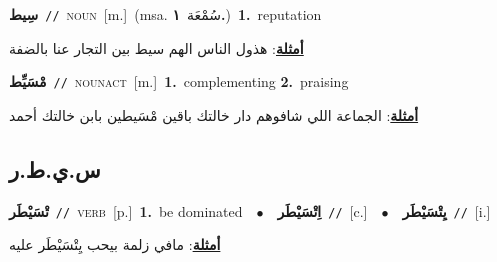 \documentclass[10pt,a4paper,twoside]{article} %
\begin{document}
\begin{multicols}{2}
{\setlength\topsep{0pt}\textbf{\foreignlanguage{arabic}{سِيط}}\ {\color{gray}\texttt{//}\color{black}}\ \textsc{noun}\ [m.]\ \color{gray}(msa. \foreignlanguage{arabic}{سُمْعَة}~\foreignlanguage{arabic}{\textbf{١.}})\color{black}\ \textbf{1.}~reputation\  \begin{flushright}\color{gray}\foreignlanguage{arabic}{\textbf{\underline{\foreignlanguage{arabic}{أمثلة}}}: هذول الناس الهم سيط بين التجار عنا بالضفة}\end{flushright}\color{black}} \vspace{2mm}

{\setlength\topsep{0pt}\textbf{\foreignlanguage{arabic}{مْسَيِّط}}\ {\color{gray}\texttt{//}\color{black}}\ \textsc{noun\textunderscore act}\ [m.]\ \textbf{1.}~complementing  \textbf{2.}~praising\  \begin{flushright}\color{gray}\foreignlanguage{arabic}{\textbf{\underline{\foreignlanguage{arabic}{أمثلة}}}: الجماعة اللي شافوهم دار خالتك باقين مْسَيطين بابن خالتك أحمد}\end{flushright}\color{black}} \vspace{2mm}

\vspace{-3mm}
\subsection*{\color{blue}\foreignlanguage{arabic}{س.ي.ط.ر}\color{blue}{}} 

{\setlength\topsep{0pt}\textbf{\foreignlanguage{arabic}{تْسَيْطَر}}\ {\color{gray}\texttt{//}\color{black}}\ \textsc{verb}\ [p.]\ \textbf{1.}~be dominated\ \ $\bullet$\ \ \setlength\topsep{0pt}\textbf{\foreignlanguage{arabic}{اِتْسَيْطَر}}\ {\color{gray}\texttt{//}\color{black}}\ [c.]\ \ $\bullet$\ \ \setlength\topsep{0pt}\textbf{\foreignlanguage{arabic}{يِتْسَيْطَر}}\ {\color{gray}\texttt{//}\color{black}}\ [i.]\  \begin{flushright}\color{gray}\foreignlanguage{arabic}{\textbf{\underline{\foreignlanguage{arabic}{أمثلة}}}: مافي زلمة بيحب يِتْسَيْطَر عليه}\end{flushright}\color{black}} \vspace{2mm}


\end{multicols}
\end{document}
